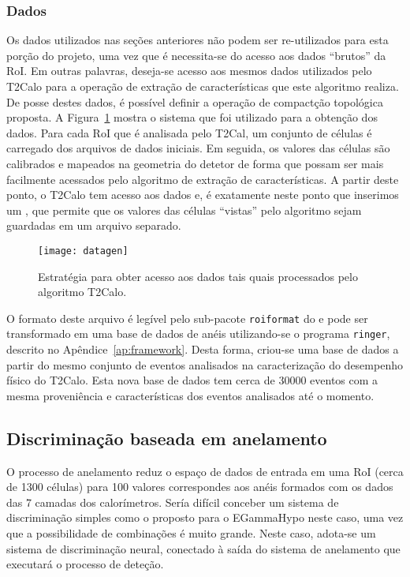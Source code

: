 \subsubsection{Dados}

Os dados utilizados nas seções anteriores não podem ser re-utilizados para
esta porção do projeto, uma vez que é necessita-se do acesso aos dados
``brutos'' da RoI. Em outras palavras, deseja-se acesso aos mesmos dados
utilizados pelo T2Calo para a operação de extração de características que este
algoritmo realiza. De posse destes dados, é possível definir a operação de
compactção topológica proposta. A Figura~\ref{fig:datagen} mostra o sistema
que foi utilizado para a obtenção dos dados. Para cada RoI que é analisada
pelo T2Cal, um conjunto de células é carregado dos arquivos de dados
iniciais. Em seguida, os valores das células são calibrados e mapeados na
geometria do detetor de forma que possam ser mais facilmente acessados pelo
algoritmo de extração de características. A partir deste ponto, o T2Calo tem
acesso aos dados e, é exatamente neste ponto que inserimos um , que
permite que os valores das células ``vistas'' pelo algoritmo sejam guardadas
em um arquivo separado.

\begin{figure}
\begin{center}
\texttt{[image: datagen]}
\end{center}
\caption{Estratégia para obter acesso aos dados tais quais processados pelo
algoritmo T2Calo.}
\label{fig:datagen}
\end{figure}

O formato deste arquivo é legível pelo sub-pacote \texttt{roiformat} do
 e pode ser transformado em uma base de dados de anéis
utilizando-se o programa \texttt{ringer}, descrito no
Apêndice~\ref{ap:framework}. Desta forma, criou-se uma base de dados a partir
do mesmo conjunto de eventos analisados na caracterização do desempenho físico
do T2Calo. Esta nova base de dados tem cerca de $30000$ eventos com a mesma
proveniência e características dos eventos analisados até o momento.

\subsection{Discriminação baseada em anelamento}

O processo de anelamento reduz o espaço de dados de entrada em uma RoI (cerca
de 1300 células) para 100 valores correspondes aos anéis formados com os dados
das 7 camadas dos calorímetros. Sería difícil conceber um sistema de
discriminação simples como o proposto para o EGammaHypo neste caso, uma vez
que a possibilidade de combinações é muito grande. Neste caso, adota-se um
sistema de discriminação neural, conectado à saída do sistema de anelamento
que executará o processo de deteção.

